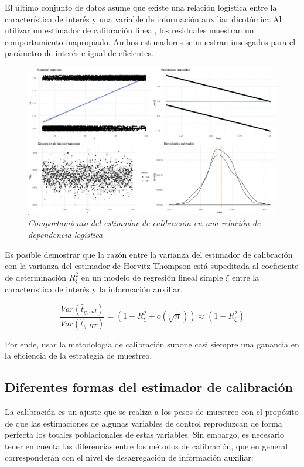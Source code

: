 \documentclass[
  12pt,
]{book}
\begin{document}
El último conjunto de datos asume que existe una relación logística entre la característica de interés y una variable de información auxiliar dicotómica Al utilizar un estimador de calibración lineal, los residuales muestran un comportamiento inapropiado. Ambos estimadores se muestran insesgados para el parámetro de interés e igual de eficientes.

\begin{figure}
\centering
\includegraphics{Pics/c8.png}
\caption{\emph{Comportamiento del estimador de calibración en una relación de dependencia logística}}
\end{figure}

Es posible demostrar que la razón entre la varianza del estimador de calibración con la varianza del estimador de Horvitz-Thompson está supeditada al coeficiente de determinación \(R^2_{\xi}\) en un modelo de regresión lineal simple \(\xi\) entre la característica de interés y la información auxiliar.

\[
\frac{Var(\hat t_{y, cal})}{Var(\hat t_{y, HT})} = (1-R^2_{\xi} + o(\sqrt{n})) \approx (1-R^2_{\xi})
\]

Por ende, usar la metodología de calibración supone casi siempre una ganancia en la eficiencia de la estrategia de muestreo.

\hypertarget{diferentes-formas-del-estimador-de-calibraciuxf3n}{%
\subsection{Diferentes formas del estimador de calibración}\label{diferentes-formas-del-estimador-de-calibraciuxf3n}}

La calibración es un ajuste que se realiza a los pesos de muestreo con el propósito de que las estimaciones de algunas variables de control reproduzcan de forma perfecta los totales poblacionales de estas variables. Sin embargo, es necesario tener en cuenta las diferencias entre los métodos de calibración, que en general corresponderán con el nivel de desagregación de información auxiliar:
\end{document}
